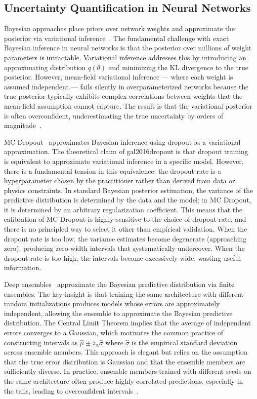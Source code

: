 \documentclass[12pt,a4paper]{article}
\theoremstyle{plain}
\begin{document}
\subsection{Uncertainty Quantification in Neural Networks}

Bayesian approaches place priors over network weights and approximate the
posterior via variational inference~\citep{kingma2014autoencoding,blundell2015weight,graves2011practical}.
The fundamental challenge with exact Bayesian inference in neural networks
is that the posterior over millions of weight parameters is intractable.
Variational inference addresses this by introducing an approximating
distribution $q(\theta)$ and minimizing the KL divergence to the true
posterior. However, mean-field variational inference --- where each weight
is assumed independent --- fails silently in overparameterized networks
because the true posterior typically exhibits complex correlations between
weights that the mean-field assumption cannot capture. The result is that
the variational posterior is often overconfident, underestimating the true
uncertainty by orders of magnitude~\citep{ovadia2019uncertainty}.

MC Dropout~\citep{gal2016dropout,molchanov2017variational} approximates Bayesian inference
using dropout as a variational approximation. The theoretical claim of
gal2016dropout is that dropout training is equivalent to approximate
variational inference in a specific model. However, there is a fundamental
tension in this equivalence: the dropout rate is a hyperparameter chosen by
the practitioner rather than derived from data or physics constraints.
In standard Bayesian posterior estimation, the variance of the predictive
distribution is determined by the data and the model; in MC Dropout, it is
determined by an arbitrary regularization coefficient. This means that the
calibration of MC Dropout is highly sensitive to the choice of dropout rate,
and there is no principled way to select it other than empirical validation.
When the dropout rate is too low, the variance estimates become degenerate
(approaching zero), producing zero-width intervals that systematically
undercover. When the dropout rate is too high, the intervals become
excessively wide, wasting useful information.

Deep ensembles~\citep{lakshminarayanan2017simple} approximate the Bayesian predictive
distribution via finite ensembles. The key insight is that training the same
architecture with different random initializations produces models whose
errors are approximately independent, allowing the ensemble to approximate
the Bayesian predictive distribution. The Central Limit Theorem implies
that the average of independent errors converges to a Gaussian, which
motivates the common practice of constructing intervals as
$\hat{\mu} \pm z_\alpha \hat{\sigma}$ where $\hat{\sigma}$ is the empirical
standard deviation across ensemble members. This approach is elegant but
relies on the assumption that the true error distribution is Gaussian and
that the ensemble members are sufficiently diverse. In practice, ensemble
members trained with different seeds on the same architecture often produce
highly correlated predictions, especially in the tails, leading to
overconfident intervals~\citep{esposito2024conformal}.
\end{document}
